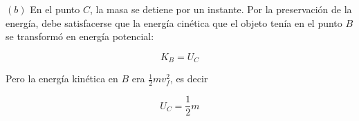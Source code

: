 \documentclass[12pt]{article}
\theoremstyle{definition}
\begin{document}
$(b)$ En el punto $C$, la masa se detiene por un instante. Por la preservación
de la energía, debe satisfacerse que la energía cinética que el objeto tenía en
el punto $B$ se transformó
 en energía potencial: 

 \begin{equation}
    K_B = U_C
 \end{equation}

Pero la energía kinética en $B$ era $\frac{1}{2} m v_f^2$, es decir 

\begin{equation*}
    U_C = \frac{1}{2}m
\end{equation*}
\end{document}
